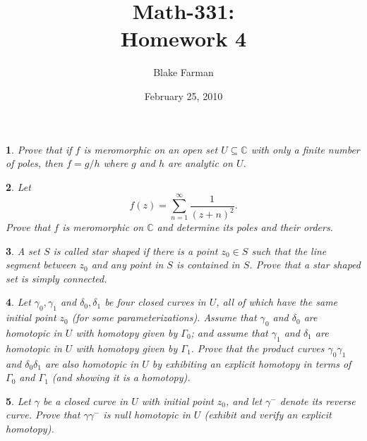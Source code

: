 \documentclass[10pt]{amsart}
\author{Blake Farman}
\title{Math-331:\\Homework 4}
\date{February 25, 2010}\pdfpagewidth 8.5in
\begin{document}
\maketitle

\newcommand{\Z}{\mathbb{Z}}
\newcommand{\R}{\mathbb{R}}
\newcommand{\Q}{\mathbb{Q}}
\newcommand{\C}{\mathbb{C}}

\renewcommand{\qedsymbol}{\(\blacksquare\)}
\renewcommand{\phi}{\varphi}
\renewcommand{\epsilon}{\varepsilon}

\newenvironment{alphaenum}{
  \begin{enumerate}
    \renewcommand{\theenumi}{(\alph{enumi})}
    \renewcommand{\labelenumi}{\theenumi}
  }
  {\end{enumerate}}
\newenvironment{as}{\begin{align*}}{\end{align*}}

\newtheorem{thm}{}

\begin{thm}
  \label{Ex1}
  Prove that if $f$ is meromorphic on an open set $U \subseteq \C$ with only 
a finite number of poles, then $f = g/h$ where $g$ and $h$ are analytic on 
$U$. 
\end{thm}

\begin{thm}
  \label{Ex2}
  Let $$f(z) = \sum\limits_{n=1}^\infty \dfrac{1}{(z+n)^2}.$$
Prove that $f$ is meromorphic on $\C$ and determine its poles and their orders.
\end{thm}

\begin{thm}
  \label{Ex3}
  A set $S$ is called {\it star shaped} if there is a point $z_0 \in S$ such that
the line segment between $z_0$ and any point in $S$ is contained in $S$.
Prove that a star shaped set is simply connected.
\end{thm}

\begin{thm}
  \label{Ex4}
  Let $\gamma_0, \gamma_1$ and $\delta_0,\delta_1$ be four closed curves in $U$,
all of which have the same initial point $z_0$ (for some parameterizations).  
Assume that $\gamma_0$ and $\delta_0$ are
homotopic in $U$ with homotopy given by $\Gamma_0$;
and assume that $\gamma_1$ and $\delta_1$ are homotopic in $U$ with homotopy
given by $\Gamma_1$.
Prove that the product curves $\gamma_0 \gamma_1$ and $\delta_0 \delta_1$ are also homotopic
in $U$ by exhibiting an explicit homotopy in terms of $\Gamma_0$ and $\Gamma_1$
(and showing it is a homotopy).
\end{thm}

\begin{thm}
  \label{Ex5}
  Let $\gamma$ be a closed curve in $U$ with initial point $z_0$, and let
$\gamma^{-}$ denote its reverse curve.
Prove that $\gamma \gamma^{-}$ is null homotopic
in $U$ (exhibit and verify an explicit homotopy).
\end{thm}
\end{document}
